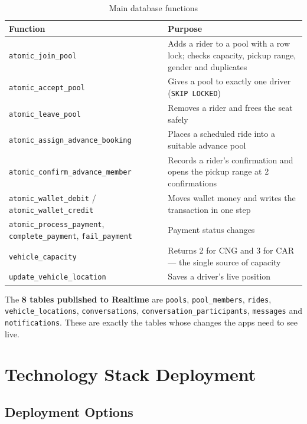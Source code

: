 \begin{table}[H]
  \centering
  \small
  \caption{Main database functions}
  \label{tab:db-functions}
  \begin{tabularx}{\textwidth}{@{}p{5.6cm}L@{}}
    \toprule
    \textbf{Function} & \textbf{Purpose} \\
    \midrule
    \texttt{atomic\_join\_pool} & Adds a rider to a pool with a row lock; checks capacity, pickup range, gender and duplicates \\
    \texttt{atomic\_accept\_pool} & Gives a pool to exactly one driver (\texttt{SKIP LOCKED}) \\
    \texttt{atomic\_leave\_pool} & Removes a rider and frees the seat safely \\
    \texttt{atomic\_assign\_advance\_booking} & Places a scheduled ride into a suitable advance pool \\
    \texttt{atomic\_confirm\_advance\_member} & Records a rider's confirmation and opens the pickup range at 2 confirmations \\
    \texttt{atomic\_wallet\_debit} / \texttt{atomic\_wallet\_credit} & Moves wallet money and writes the transaction in one step \\
    \texttt{atomic\_process\_payment}, \texttt{complete\_payment}, \texttt{fail\_payment} & Payment status changes \\
    \texttt{vehicle\_capacity} & Returns 2 for CNG and 3 for CAR --- the single source of capacity \\
    \texttt{update\_vehicle\_location} & Saves a driver's live position \\
    \bottomrule
  \end{tabularx}
\end{table}

The \textbf{8 tables published to Realtime} are \texttt{pools},
\texttt{pool\_members}, \texttt{rides}, \texttt{vehicle\_locations},
\texttt{conversations}, \texttt{conversation\_participants},
\texttt{messages} and \texttt{notifications}. These are exactly the tables
whose changes the apps need to see live.

\section{Technology Stack Deployment}
\label{sec:deployment}

\subsection{Deployment Options}
\label{subsec:deploy-options}

